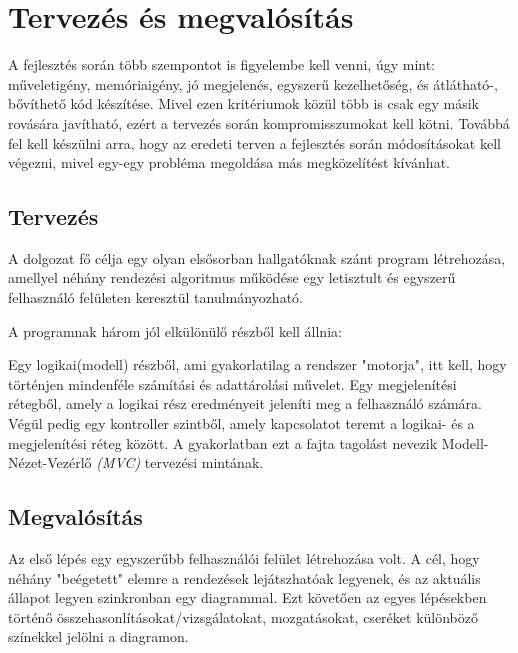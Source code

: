 \documentclass{elteikthesis}
\begin{document}
\section{Tervezés és megvalósítás}
A fejlesztés során több szempontot is figyelembe kell venni, úgy mint: műveletigény, memóriaigény, jó megjelenés, egyszerű kezelhetőség, és átlátható-, bővíthető kód készítése. Mivel ezen kritériumok közül több is csak egy másik rovására javítható, ezért a tervezés során kompromisszumokat kell kötni. Továbbá fel kell készülni arra, hogy az eredeti terven a fejlesztés során módosításokat kell végezni, mivel egy-egy probléma megoldása más megközelítést kívánhat.

\subsection{Tervezés}
A dolgozat fő célja egy olyan elsősorban hallgatóknak szánt program létrehozása, amellyel néhány rendezési algoritmus működése egy letisztult és egyszerű felhasználó felületen keresztül tanulmányozható.\par
A programnak három jól elkülönülő részből kell állnia:\par
Egy logikai(modell) részből, ami gyakorlatilag a rendszer "motorja", itt kell, hogy történjen mindenféle számítási és adattárolási művelet. Egy megjelenítési rétegből, amely a logikai rész eredményeit jeleníti meg a felhasználó számára. Végül pedig egy kontroller szintből, amely kapcsolatot teremt a logikai- és a megjelenítési réteg között. A gyakorlatban ezt a fajta tagolást nevezik Modell-Nézet-Vezérlő \emph{(MVC)} tervezési mintának.

\subsection{Megvalósítás}
Az első lépés egy egyszerűbb felhasználói felület létrehozása volt. A cél, hogy néhány "beégetett" elemre a rendezések lejátszhatóak legyenek, és az aktuális állapot legyen szinkronban egy diagrammal. Ezt követően az egyes lépésekben történő összehasonlításokat/vizsgálatokat, mozgatásokat, cseréket különböző színekkel jelölni a diagramon.
\end{document}
